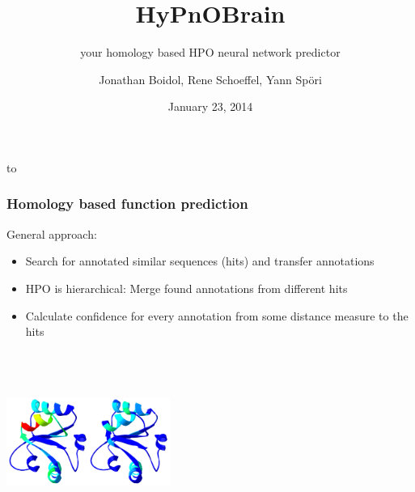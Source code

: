 \documentclass{beamer}
\author{Jonathan Boidol, Rene Schoeffel, Yann Sp\"ori}
\title{HyPnOBrain}
\subtitle{your homology based HPO neural network predictor}
\date{January 23, 2014 }
\begin{document}
{
\usebackgroundtemplate%
{%
    \vbox to 
    
}
 
\begin{frame}
\maketitle
 
\end{frame}
}
\begin{frame}
  \frametitle{Homology based function prediction}
  General approach:
  \begin{itemize}
  	\item Search for annotated similar sequences (hits) and transfer annotations
  	\item HPO is hierarchical: Merge found annotations from different hits
  	\item Calculate confidence for every annotation from some distance measure to the hits
  \end{itemize}
  \hfill\\  \hfill\\  \hfill\\
  \hfill\includegraphics[width=0.4\textwidth]{homologs.png}

\end{frame}
\end{document}
